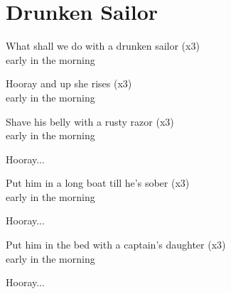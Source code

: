 \section{Drunken Sailor}
What shall we do with a drunken sailor (x3)\\
early in the morning

Hooray and up she rises (x3)\\
early in the morning

Shave his belly with a rusty razor (x3)\\
early in the morning

Hooray...

Put him in a long boat till he's sober (x3)\\
early in the morning

Hooray...

Put him in the bed with a captain's daughter (x3)\\
early in the morning

Hooray...